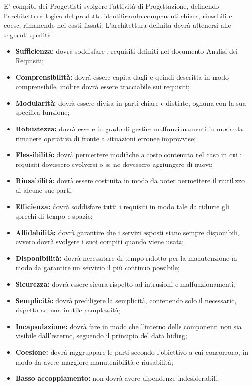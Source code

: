 \documentclass[../NomeDocumento.tex]{subfiles}
\begin{document}
	E' compito dei Progettisti svolgere l'attività di Progettazione, definendo l'architettura logica del prodotto identificando componenti chiare, riusabili e coese, rimanendo nei costi fissati. L'architettura definita dovrà attenersi alle seguenti qualità:
	\begin{itemize}
		\item \textbf{Sufficienza:} dovrà soddisfare i requisiti definiti nel documento Analisi dei Requisiti;
		\item \textbf{Comprensibilità:} dovrà essere capita dagli  e quindi descritta in modo comprensibile, inoltre dovrà essere tracciabile sui requisiti;
		\item \textbf{Modularità:} dovrà essere divisa in parti chiare e distinte, ognuna con la sua specifica funzione;
		\item \textbf{Robustezza:} dovrà essere in grado di gestire malfunzionamenti in modo da rimanere operativa di fronte a situazioni erronee improvvise;
		\item \textbf{Flessibilità:} dovrà permettere modifiche a costo contenuto nel caso in cui i requisiti dovessero evolversi o se ne dovessero aggiungere di nuovi;
		\item \textbf{Riusabilità:} dovrà essere costruita in modo da poter permettere il riutilizzo di alcune sue parti;
		\item \textbf{Efficienza:} dovrà soddisfare tutti i requisiti in modo tale da ridurre gli sprechi di tempo e spazio;
		\item \textbf{Affidabilità:} dovrà garantire che i servizi esposti siano sempre disponibili, ovvero dovrà svolgere i suoi compiti quando viene usata;
		\item \textbf{Disponibilità:} dovrà necessitare di tempo ridotto per la manutenzione in modo da garantire un servizio il più continuo possibile;
		\item \textbf{Sicurezza:} dovrà essere sicura rispetto ad intrusioni e malfunzionamenti;
		\item \textbf{Semplicità:} dovrà prediligere la semplicità, contenendo solo il necessario, rispetto ad una inutile complessità;
		\item \textbf{Incapsulazione:} dovrà fare in modo che l'interno delle componenti non sia visibile dall'esterno, seguendo il principio del data hiding;
		\item \textbf{Coesione:} dovrà raggruppare le parti secondo l'obiettivo a cui concorrono, in modo da avere maggiore manutenibilità e riusabilità;
		\item \textbf{Basso accoppiamento:} non dovrà avere dipendenze indesiderabili.
	\end{itemize}
\end{document}
